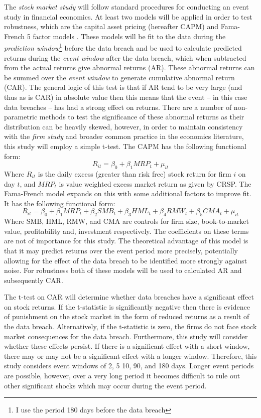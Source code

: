 \documentclass[../Main.tex]{subfiles}
\begin{document}
The \textit{stock market study} will follow standard procedures for conducting an event study in financial economics. At least two models will be applied in order to test robustness, which are the capital asset pricing (hereafter CAPM) and Fama-French 5 factor models \citep{fama2015}. These models will be fit to the data during the \textit{prediction window}\footnote{I use the period 180 days before the data breach} before the data breach and be used to calculate predicted returns during the \textit{event window} after the data breach, which when subtracted from the actual returns give abnormal returns (AR). These abnormal returns can be summed over the \textit{event window} to generate cumulative abnormal return (CAR). The general logic of this test is that if AR tend to be very large (and thus as is CAR) in absolute value then this means that the event – in this case data breaches – has had a strong effect on returns. There are a number of non-parametric methods to test the significance of these abnormal returns as their distribution can be heavily skewed, however, in order to maintain consistency with the \textit{firm study} and broader common practice in the economics literature, this study will employ a simple t-test. The CAPM has the following functional form:
\begin{equation}
    \label{capmequation}
    R_{it} = \beta_0 + \beta_1 MRP_t + \mu_{it}
\end{equation}
Where $R_{it}$ is the daily excess (greater than risk free) stock return for firm $i$ on day $t$, and $MRP_t$ is value weighted excess market return as given by CRSP. The Fama-French model expands on this with some additional factors to improve fit. It has the following functional form:
\begin{equation}
    \label{ffequation}
    R_{it} = \beta_0 + \beta_1 MRP_t + \beta_2 SMB_t + \beta_3 HML_t + \beta_4 RMW_t + \beta_5 CMA_t + \mu_{it}
\end{equation}
Where SMB, HML, RMW, and CMA are controls for firm size, book-to-market value, profitability and, investment respectively. The coefficients on these terms are not of importance for this study. The theoretical advantage of this model is that it may predict returns over the event period more precisely, potentially allowing for the effect of the data breach to be identified more strongly against noise. For robustness both of these models will be used to calculated AR and subsequently CAR.

The t-test on CAR will determine whether data breaches have a significant effect on stock returns. If the t-statistic is significantly negative then there is evidence of punishment on the stock market in the form of reduced returns as a result of the data breach. Alternatively, if the t-statistic is zero, the firms do not face stock market consequences for the data breach. Furthermore, this study will consider whether these effects persist. If there is a significant effect with a short window, there may or may not be a significant effect with a longer window. Therefore, this study considers event windows of 2, 5 10, 90, and 180 days. Longer event periods are possible, however, over a very long period it becomes difficult to rule out other significant shocks which may occur during the event period.
\end{document}
